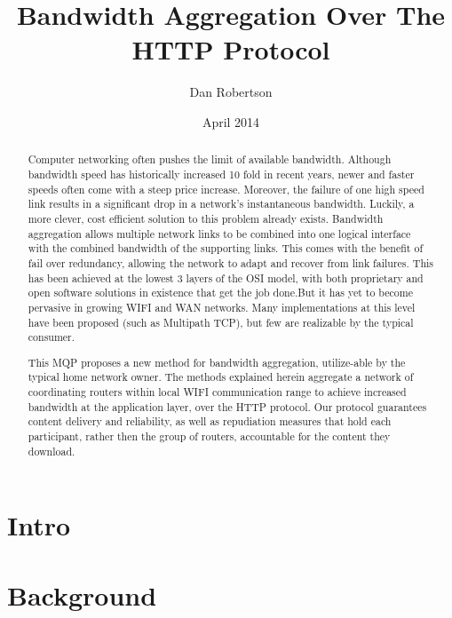 \documentclass[12pt]{article}
\begin{document}
\title{Bandwidth Aggregation Over The HTTP Protocol}
\author{Dan Robertson}
\date{April 2014}
\maketitle

\begin{abstract}
	Computer networking often pushes the limit of available bandwidth. Although bandwidth speed has historically increased 10 fold in recent years, newer and faster speeds often come with a steep price increase. Moreover, the failure of one high speed link results in a significant drop in a network's instantaneous bandwidth. Luckily, a more clever, cost efficient solution to this problem already exists. Bandwidth aggregation allows multiple network links to be combined into one logical interface with the combined bandwidth of the supporting links. This comes with the benefit of fail over redundancy, allowing the network to adapt and recover from link failures. This has been achieved at the lowest 3 layers of the OSI model, with both proprietary and open software solutions in existence that get the job done.But it has yet to become pervasive in growing WIFI and WAN networks. Many implementations at this level have been proposed (such as Multipath TCP), but few are realizable by the typical consumer.

	This MQP proposes a new method for bandwidth aggregation, utilize-able by the typical home network owner. The methods explained herein aggregate a network of coordinating routers within local WIFI communication range to achieve increased bandwidth at the application layer, over the HTTP protocol. Our protocol guarantees content delivery and reliability, as well as repudiation measures that hold each participant, rather then the group of routers, accountable for the content they download.
\end{abstract}


\newpage
\section{Intro}

\newpage
\section{Background}
\end{document}

